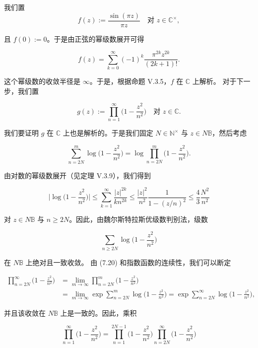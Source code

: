 \begin{application}
\begin{items}
\proofhead
我们置
\[
f(z) := \frac{\sin(\pi z)}{\pi z} \quad \text{对 } z \in \mathbb{C}^{\times} ,
\]

且 $ f(0) := 0 $。于是由正弦的幂级数展开可得

\begin{equation}
f(z) = \sum_{k=0}^{\infty}(-1)^{k}\frac{\pi^{2k}z^{2k}}{(2k+1)!} .\tag{7.19}
\end{equation}

这个幂级数的收敛半径是 $ \infty $。于是，根据命题 V.3.5，$ f $ 在 $ \mathbb{C} $ 上解析。
对于下一步，我们置

\[
g(z) := \prod_{n=1}^{\infty}\Big(1 - \frac{z^{2}}{n^{2}}\Big) \quad \text{对 } z \in \mathbb{C} .
\]

我们要证明 $ g $ 在 $ \mathbb{C} $ 上也是解析的。于是我们固定 $ N \in \mathbb{N}^{\times} $ 与 $ z \in N\mathbb{B} $，然后考虑

\begin{equation}
\sum_{n=2N}^{m}\log\Big(1 - \frac{z^{2}}{n^{2}}\Big) = \log\prod_{n=2N}^{m}\Big(1 - \frac{z^{2}}{n^{2}}\Big) .\tag{7.20}
\end{equation}

由对数的幂级数展开（见定理 V.3.9），我们得到

\[
\Big|\log\Big(1 - \frac{z^{2}}{n^{2}}\Big)\Big| \le \sum_{k=1}^{\infty}\frac{|z|^{2k}}{kn^{2k}} \le \frac{|z|^{2}}{n^{2}}\frac{1}{1 - (z/n)^{2}} \le \frac{4}{3}\frac{N^{2}}{n^{2}}
\]

对 $ z \in N\mathbb{B} $ 与 $ n \ge 2N $。因此，由魏尔斯特拉斯优级数判别法，级数

\[
\sum_{n \ge 2N}\log\Big(1 - \frac{z^{2}}{n^{2}}\Big)
\]

在 $ N\mathbb{B} $ 上绝对且一致收敛。
由 (7.20) 和指数函数的连续性，我们可以断定

\begin{equation}
\begin{aligned}
\prod_{n=2N}^{\infty}\Big(1 - \frac{z^{2}}{n^{2}}\Big) &= \lim_{m \to \infty}\prod_{n=2N}^{m}\Big(1 - \frac{z^{2}}{n^{2}}\Big) \\ &= \lim_{m \to \infty}\exp\sum_{n=2N}^{m}\log\Big(1 - \frac{z^{2}}{n^{2}}\Big) = \exp\sum_{n=2N}^{\infty}\log\Big(1 - \frac{z^{2}}{n^{2}}\Big) ,
\end{aligned}\tag{7.21}
\end{equation}

并且该收敛在 $ N\mathbb{B} $ 上是一致的。因此，乘积

\begin{equation}
\prod_{n=1}^{\infty}\Big(1 - \frac{z^{2}}{n^{2}}\Big) = \prod_{n=1}^{2N-1}\Big(1 - \frac{z^{2}}{n^{2}}\Big)\prod_{n=2N}^{\infty}\Big(1 - \frac{z^{2}}{n^{2}}\Big)\tag{7.22}
\end{equation}


\end{items}
\end{application}
